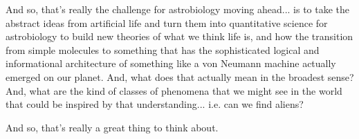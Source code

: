 \documentclass[]{article}
\begin{document}
And so, that's really the challenge
for astrobiology moving ahead...
is to take the abstract ideas
from artificial life
and turn them into quantitative science
for astrobiology to build new theories
of what we think life is,
and how the transition
from simple molecules to something
that has the sophisticated logical
and informational architecture
of something
like a von Neumann machine
actually emerged on our planet.
And, what does that actually mean
in the broadest sense?
And, what are the kind of classes
of phenomena
that we might see in the world
that could be inspired
by that understanding...
i.e. can we find aliens?

And so, that's really a great thing
to think about.



\printglossaries

 


\end{document}
